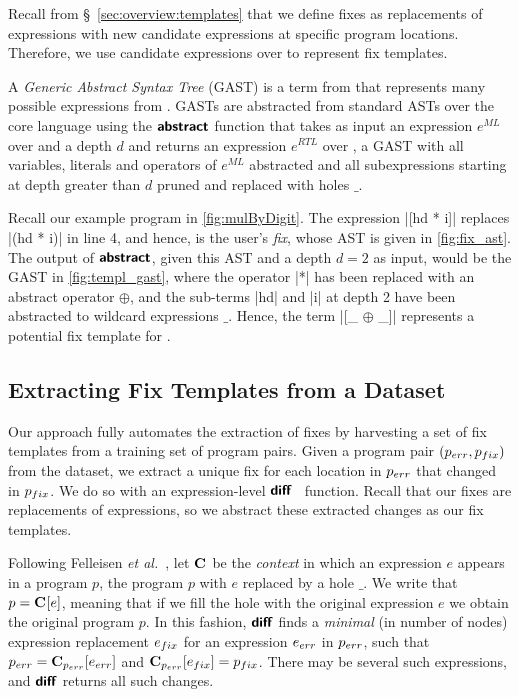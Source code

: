 Recall from \S~\ref{sec:overview:templates} that we define fixes as
replacements of expressions with new candidate expressions at specific program
locations. Therefore, we use candidate expressions over \repairLang to represent
fix templates.

A \emph{Generic Abstract Syntax Tree} (GAST) is a term from \repairLang that
represents many possible expressions from \lang. GASTs are abstracted from
standard ASTs over the core language \lang using the $\bm{\mathsf{abstract}}$ function that
takes as input an expression $e^{ML}$ over \lang and a depth $d$ and returns an
expression $e^{RTL}$ over \repairLang, \ie a GAST with all variables, literals
and operators of $e^{ML}$ abstracted and all subexpressions starting at depth
greater than $d$ pruned and replaced with holes $\_$.

Recall our example program \mbd in \autoref{fig:mulByDigit}.
%
The expression |[hd * i]| replaces |(hd * i)| in line 4, and hence, is the
user's \emph{fix}, whose AST is given in \autoref{fig:fix_ast}.
%
The output of $\bm{\mathsf{abstract}}$, given this AST and a depth $d = 2$ as input, would be
the GAST in \autoref{fig:templ_gast}, where the operator |*| has been replaced
with an abstract operator $\oplus$, and the sub-terms |hd| and |i| at depth 2
have been abstracted to wildcard expressions $\_$.
%
Hence, the \repairLang term |[_ $\oplus$ _]| represents a potential fix template
for \mbd.



\subsection{Extracting Fix Templates from a Dataset}
\label{sec:templ-partition:templates}

Our approach fully automates the extraction of fixes by harvesting a set of fix
templates from a training set of program pairs.
%
Given a program pair $(p_{err}, p_{fix})$ from the dataset, we extract a unique fix
for each location in $p_{err}$ that changed in $p_{fix}$.
%
We do so with an expression-level $\bm{\mathsf{diff}}$~\citep{Lempsink2009-xf} function.
%
Recall that our fixes are replacements of expressions, so
we abstract these extracted changes as our fix templates.

%
Following Felleisen \emph{et al.}~\cite{Felleisen92}, let $\mathbf{C}_{}$ be the \emph{context} in which an
expression $e$ appears in a program $p$, \ie the program $p$ with $e$
replaced by a hole $\_$.
%
We write that $p = \mathbf{C}_{}[e]$, meaning that if we fill the hole with the
original expression $e$ we obtain the original program $p$.
%
In this fashion, $\bm{\mathsf{diff}}$ finds a \emph{minimal} (in number of nodes)
expression replacement $e_{fix}$ for an expression $e_{err}$ in $p_{err}$, such that
$p_{err} = \mathbf{C}_{p_{err}}[e_{err}]$ and $\mathbf{C}_{p_{err}}[e_{fix}] = p_{fix}$.
%
There may be several such expressions, and $\bm{\mathsf{diff}}$ returns all
such changes.

